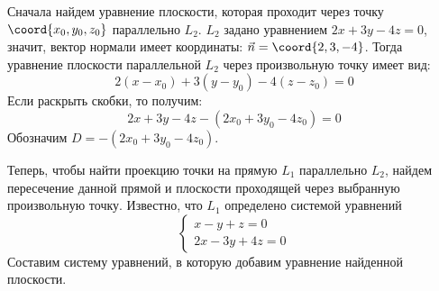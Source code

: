 Сначала найдем уравнение плоскости,
которая проходит через точку \(\coord{x_0, y_0, z_0}\) параллельно \(L_2\).
\(L_2\) задано уравнением \(2x+3y-4z=0\), значит,
вектор нормали имеет координаты: \(\vec{n} = \coord{2, 3, -4}\).
Тогда уравнение плоскости параллельной \(L_2\)
через произвольную точку имеет вид:
\[2(x - x_0) + 3(y - y_0) - 4(z - z_0) = 0\]
Если раскрыть скобки, то получим:
\[2 x + 3 y - 4 z - (2 x_0 + 3 y_0 - 4 z_0) = 0\]
Обозначим \(D = - (2x_0+3y_0-4z_0)\).

Теперь, чтобы найти проекцию точки на прямую \(L_1\) параллельно \(L_2\),
найдем пересечение данной прямой и плоскости проходящей через выбранную
произвольную точку.
Известно, что \(L_1\) определено системой уравнений
\[
  \begin{cases}
    x - y + z = 0 \\
    2x - 3y + 4z = 0
  \end{cases}
\]
Составим систему уравнений, в которую добавим уравнение найденной плоскости.

